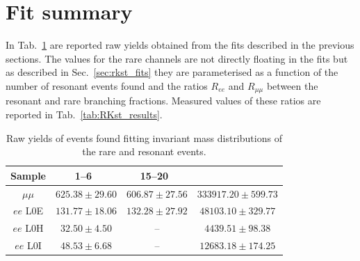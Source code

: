 \section{Fit summary}

In Tab.~\ref{tab:RKst_yields} are reported raw yields obtained from the
fits described in the previous sections. The values for the rare channels are not
directly floating in the fits but as described in Sec.~\ref{sec:rkst_fits} they are parameterised
as a function of the number of resonant events found and the ratios $R_{ee}$ and $R_{\mu\mu}$
between the resonant and rare branching fractions. Measured values of these ratios are reported 
in Tab.~\ref{tab:RKst_results}.

\begin{table}
\centering
\begin{tabular}{|c|c|c|c|}
\hline
 Sample 			& 1--6~\gevgevcccc 				& 15--20~\gevgevcccc 				& \jpsi  \\ \hline
$\mu\mu$ 			& $ 625.38  \pm  29.60 $ & $ 606.87  \pm  27.56 $ & $ 333917.20  \pm  599.73 $ \\
$ee$ L0E 	& $ 131.77  \pm  18.06 $ & $ 132.28  \pm  27.92 $ & $ 48103.10  \pm  329.77 $ \\
$ee$ L0H 	& $ 32.50  \pm  4.50 $ & -- & $ 4439.51  \pm  98.38 $ \\
$ee$ L0I 	& $ 48.53  \pm  6.68 $ & -- & $ 12683.18  \pm  174.25 $ \\
\hline 
 \end{tabular}
\caption{Raw yields of events found fitting invariant mass distributions of the rare and resonant events. }
\label{tab:RKst_yields}
\end{table}


\clearpage

